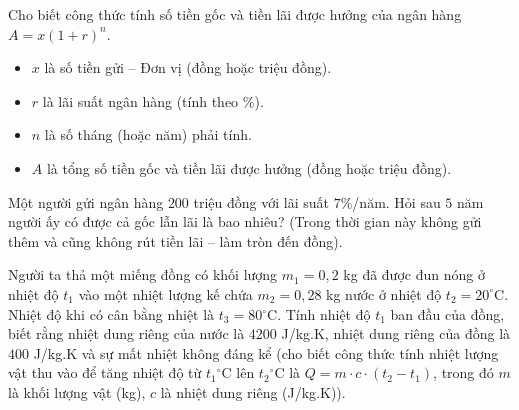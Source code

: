 \begin{bt}%
	Cho biết công thức tính số tiền gốc và tiền lãi được hưởng của ngân hàng $A=x(1+r)^n$.
	\begin{itemize}
		\item $x$ là số tiền gửi – Đơn vị (đồng hoặc triệu đồng).
		\item $r$ là lãi suất ngân hàng (tính theo $\%$).
		\item $n$ là số tháng (hoặc năm) phải tính.
		\item $A$ là tổng số tiền gốc và tiền lãi được hưởng (đồng hoặc triệu đồng).
	\end{itemize}
	Một người gửi ngân hàng $200$ triệu đồng với lãi suất $7\%$/năm. Hỏi sau $5$ năm người ấy có được cả gốc lẫn lãi là bao nhiêu?
	(Trong thời gian này không gửi thêm và cũng không rút tiền lãi – làm tròn đến đồng).
\end{bt}

\begin{bt}%
	Người ta thả một miếng đồng có khối lượng $m_1 = 0{,}2$ kg đã được đun nóng ở nhiệt độ $t_1$ vào một nhiệt lượng kế chứa $m_2 = 0{,}28$ kg nước ở nhiệt độ $t_2 = 20^\circ$C. Nhiệt độ khi có cân bằng nhiệt là $t_3 = 80$$^\circ$C. Tính nhiệt độ $t_1$ ban đầu của đồng, biết rằng nhiệt dung riêng của nước là $4200$ J/kg.K, nhiệt dung riêng của đồng là $400$ J/kg.K và sự mất nhiệt không đáng kể (cho biết công thức tính nhiệt lượng vật thu vào để tăng nhiệt độ từ $t_1$$^\circ$C lên $t_2$$^\circ$C là $Q = m\cdot c\cdot (t_2 - t_1)$, trong đó $m$ là khối lượng vật (kg), $c$ là nhiệt dung riêng (J/kg.K)).
\end{bt}

